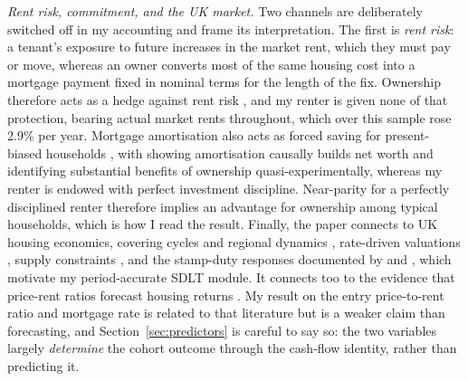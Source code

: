 \emph{Rent risk, commitment, and the UK market.} Two channels are deliberately switched off in my accounting and frame its interpretation. The first is \emph{rent risk}: a tenant's exposure to future increases in the market rent, which they must pay or move, whereas an owner converts most of the same housing cost into a mortgage payment fixed in nominal terms for the length of the fix. Ownership therefore acts as a hedge against rent risk \parencite{sinai2005}, and my renter is given none of that protection, bearing actual market rents throughout, which over this sample rose 2.9\% per year. Mortgage amortisation also acts as forced saving for present-biased households \parencite{laibson1997,thaler2004,schlafmann2021}, with \textcite{bernstein2024} showing amortisation causally builds net worth and \textcite{sodini2023} identifying substantial benefits of ownership quasi-experimentally, whereas my renter is endowed with perfect investment discipline. Near-parity for a perfectly disciplined renter therefore implies an advantage for ownership among typical households, which is how I read the result. Finally, the paper connects to UK housing economics, covering cycles and regional dynamics \parencite{muellbauer1997,meen1999}, rate-driven valuations \parencite{milesmonro2021}, supply constraints \parencite{hilbervermeulen2016}, and the stamp-duty responses documented by \textcite{besley2014} and \textcite{bestkleven2018}, which motivate my period-accurate SDLT module. It connects too to the evidence that price-rent ratios forecast housing returns \parencite{caseshiller1989,campbellshiller1988,gallin2008,campbell2009,engstedpedersen2015}. My result on the entry price-to-rent ratio and mortgage rate is related to that literature but is a weaker claim than forecasting, and Section~\ref{sec:predictors} is careful to say so: the two variables largely \emph{determine} the cohort outcome through the cash-flow identity, rather than predicting it.
